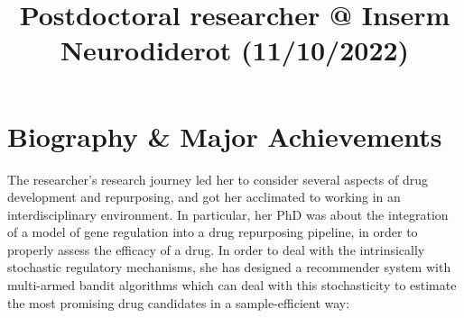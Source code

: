 \documentclass[11pt,a4paper,sans]{moderncv}
\title{Postdoctoral researcher @ Inserm Neurodiderot {\tiny (11/10/2022)}}
\begin{document}
\makecvtitle

\vspace{-1.5cm}
\section{Biography \& Major Achievements}

The researcher’s research journey led her to consider several aspects of drug development and repurposing, and got her acclimated to working in an interdisciplinary environment. In particular, her PhD was about the integration of a model of gene regulation into a drug repurposing pipeline, in order to properly assess the efficacy of a drug. In order to deal with the intrinsically stochastic regulatory mechanisms, she has designed a recommender system with multi-armed bandit algorithms which can deal with this stochasticity to estimate the most promising drug candidates in a sample-efficient way:
\end{document}
